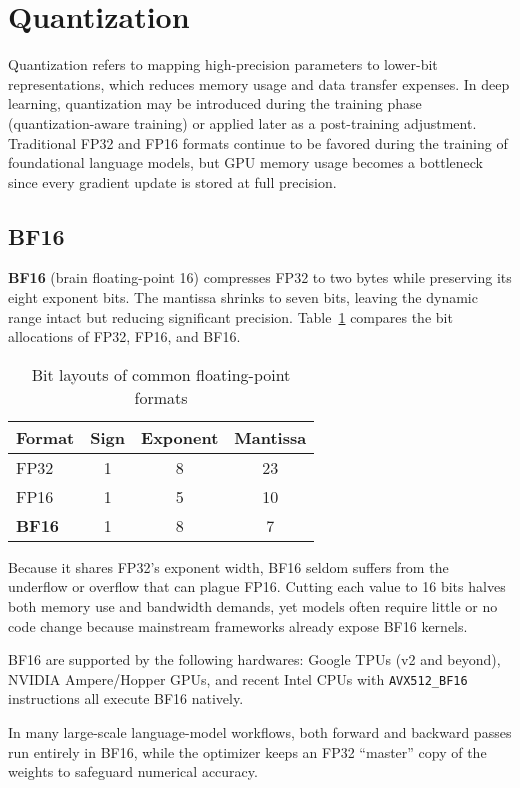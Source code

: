 \section{Quantization}

Quantization refers to mapping high-precision parameters to lower-bit representations, which reduces memory usage and data transfer expenses. In deep learning, quantization may be introduced during the training phase (quantization-aware training) or applied later as a post-training adjustment. Traditional FP32 and FP16 formats continue to be favored during the training of foundational language models, but GPU memory usage becomes a bottleneck since every gradient update is stored at full precision. 

\subsection{BF16}

\textbf{BF16} (brain floating-point 16) compresses FP32 to two bytes while preserving its eight exponent bits.  The mantissa shrinks to seven bits, leaving the dynamic range intact but reducing significant precision. Table~\ref{tab:bf16-layout} compares the bit allocations of FP32, FP16, and BF16.

\begin{table}[htbp]
\centering
\caption{Bit layouts of common floating-point formats}
\label{tab:bf16-layout}
\begin{tabular}{|l|c|c|c|}
\hline
\textbf{Format} & \textbf{Sign} & \textbf{Exponent} & \textbf{Mantissa} \\
\hline
FP32 & 1 & 8 & 23 \\
FP16 & 1 & 5 & 10 \\
\textbf{BF16} & 1 & 8 & 7 \\
\hline
\end{tabular}
\end{table}

Because it shares FP32’s exponent width, BF16 seldom suffers from the underflow or overflow that can plague FP16. Cutting each value to 16 bits halves both memory use and bandwidth demands, yet models often require little or no code change because mainstream frameworks already expose BF16 kernels.

BF16 are supported by the following hardwares: Google TPUs (v2 and beyond), NVIDIA Ampere/Hopper GPUs, and recent Intel CPUs with \texttt{AVX512\_BF16} instructions all execute BF16 natively.

In many large-scale language-model workflows, both forward and backward passes run entirely in BF16, while the optimizer keeps an FP32 “master” copy of the weights to safeguard numerical accuracy.

